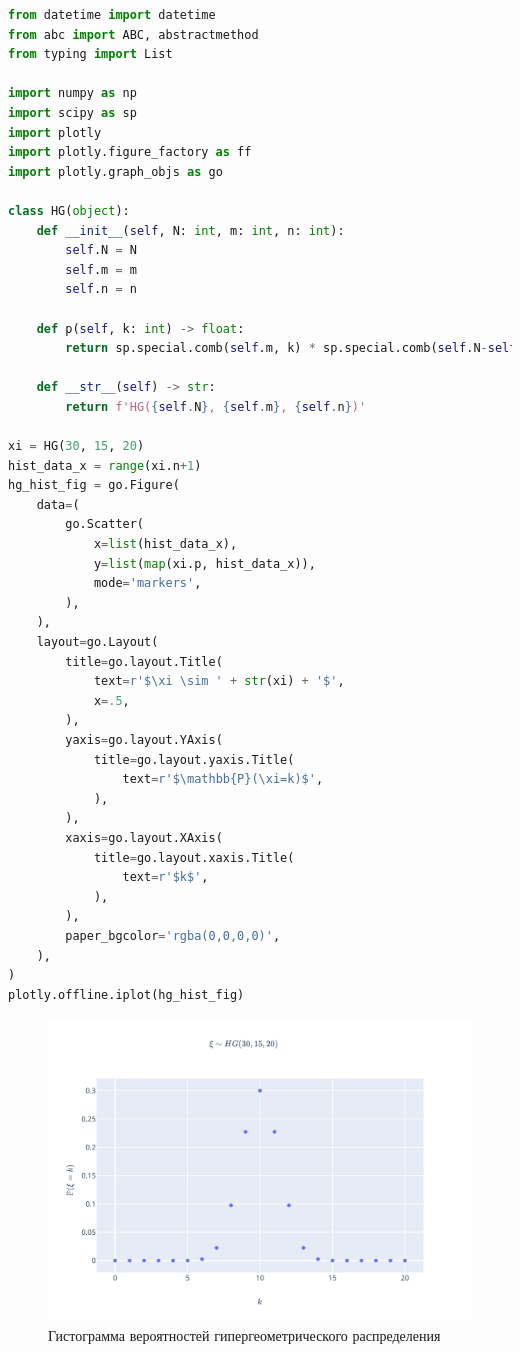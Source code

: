\documentclass[
  russian,
  a4paper,
  russian]{scrreprt}
\begin{document}
\begin{lstlisting}[language=Python]
from datetime import datetime
from abc import ABC, abstractmethod
from typing import List

import numpy as np
import scipy as sp
import plotly
import plotly.figure_factory as ff
import plotly.graph_objs as go

class HG(object):
    def __init__(self, N: int, m: int, n: int):
        self.N = N
        self.m = m
        self.n = n
    
    def p(self, k: int) -> float:
        return sp.special.comb(self.m, k) * sp.special.comb(self.N-self.m, self.n-k) / sp.special.comb(self.N, self.n)
    
    def __str__(self) -> str:
        return f'HG({self.N}, {self.m}, {self.n})'

xi = HG(30, 15, 20)
hist_data_x = range(xi.n+1)
hg_hist_fig = go.Figure(
    data=(
        go.Scatter(
            x=list(hist_data_x),
            y=list(map(xi.p, hist_data_x)),
            mode='markers',
        ),
    ),
    layout=go.Layout(
        title=go.layout.Title(
            text=r'$\xi \sim ' + str(xi) + '$',
            x=.5,
        ),
        yaxis=go.layout.YAxis(
            title=go.layout.yaxis.Title(
                text=r'$\mathbb{P}(\xi=k)$',
            ),
        ),
        xaxis=go.layout.XAxis(
            title=go.layout.xaxis.Title(
                text=r'$k$',
            ),
        ),
        paper_bgcolor='rgba(0,0,0,0)',
    ),
)
plotly.offline.iplot(hg_hist_fig)
\end{lstlisting}

\begin{figure}
\centering
\includegraphics{assets/hg_hist.svg}
\caption{Гистограмма вероятностей гипергеометрического распределения}
\end{figure}
\end{document}
